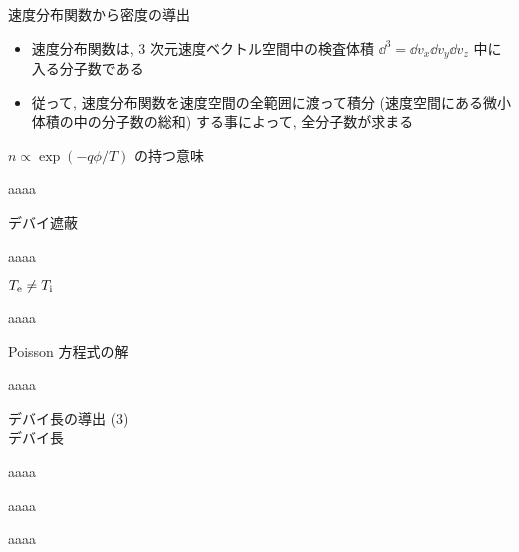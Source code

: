 \documentclass[10pt,dvipdfmx,landscape]{jsarticle}
\begin{document}
\newpage
\begin{screen}
	速度分布関数から密度の導出
\end{screen}
%
\begin{itemize}
	\item 速度分布関数は, 3 次元速度ベクトル空間中の検査体積 $\dd ^{3} = \dd v_x \dd v_y \dd v_z$ 中に入る分子数である
	\item 従って, 速度分布関数を速度空間の全範囲に渡って積分 (速度空間にある微小体積の中の分子数の総和) する事によって, 全分子数が求まる
\end{itemize}
\newpage
\begin{screen}
	$n \propto \exp ( - q \phi / T )$ の持つ意味
\end{screen}
%
aaaa
\newpage
\begin{screen}
	デバイ遮蔽
\end{screen}
%
aaaa
\newpage
\begin{screen}
	$T_{\rm e} \neq T_{\rm i}$
\end{screen}
%
aaaa
\newpage
\begin{screen}
	\vspace{1mm}
	Poisson 方程式の解
\end{screen}
%
aaaa 
\newpage
\begin{screen}
	デバイ長の導出 (3)\\
	\vspace{1mm}
	デバイ長
\end{screen}
%
aaaa 
\newpage
\begin{screen}
	
\end{screen}
%
aaaa 
\newpage
\begin{screen}
	
\end{screen}
%
aaaa   
\newpage
\end{document}
